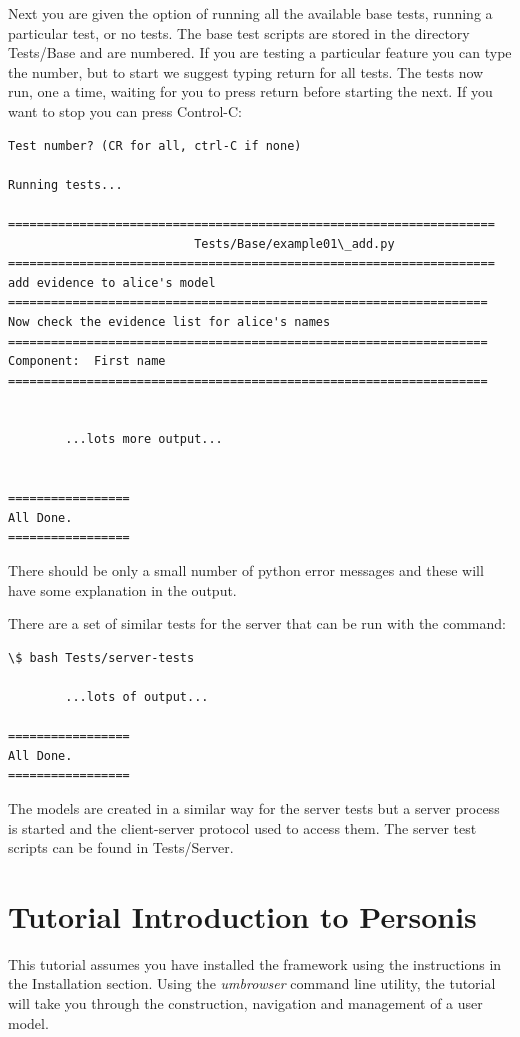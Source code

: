 \documentclass[a4paper,10pt,english]{sphinxmanual}
\begin{document}
Next you are given the option of running all the available base tests, running a particular test, or no tests.
The base test scripts are stored in the directory Tests/Base and are numbered. If you are testing a particular
feature you can type the number, but to start we suggest typing return for all tests.
The tests now run, one a time, waiting for you to press return before starting the next. If you want to stop
you can press Control-C:

\begin{Verbatim}[commandchars=\\\{\}]
Test number? (CR for all, ctrl-C if none)

Running tests...

====================================================================
                          Tests/Base/example01\_add.py
====================================================================
add evidence to alice's model
===================================================================
Now check the evidence list for alice's names
===================================================================
Component:  First name
===================================================================


        ...lots more output...


=================
All Done.
=================
\end{Verbatim}

There should be only a small number of python error messages and these will have some explanation in the output.

There are a set of similar tests for the server that can be run with the command:

\begin{Verbatim}[commandchars=\\\{\}]
\$ bash Tests/server-tests

        ...lots of output...

=================
All Done.
=================
\end{Verbatim}

The models are created in a similar way for the server tests but a server process is started and the
client-server protocol used to access them. The server test scripts can be found in Tests/Server.


\chapter{Tutorial Introduction to Personis}
\label{Tutorial::doc}\label{Tutorial:tutorial-introduction-to-personis}
This tutorial assumes you have installed the framework using the instructions in the Installation section.
Using the \emph{umbrowser} command line utility, the tutorial will take you through the construction, navigation and
management of a user model.
\end{document}
